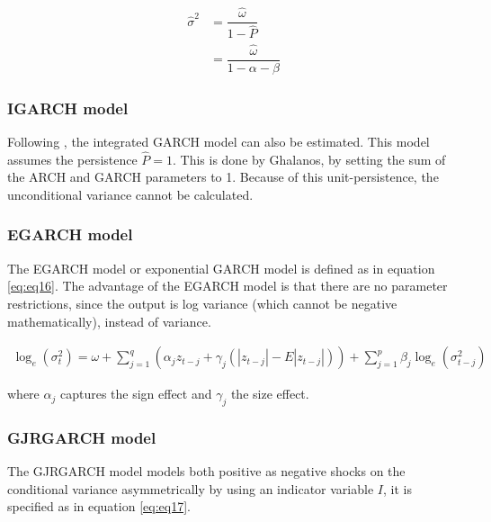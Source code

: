\documentclass[a4paper, twoside]{templates/ociamthesis}
\begin{document}
\begin{equation}
\begin{split}
\hat{\sigma}^2 
&= \dfrac{\hat{\omega}}{1 - \hat{P}} \\
&= \dfrac{\hat{\omega}}{1 - \alpha - \beta}
\end{split}
 \label{eq:eq15}
\end{equation}

\hypertarget{igarch-model}{%
\subsubsection{IGARCH model}\label{igarch-model}}

\noindent Following \textcite{ghalanos2020}, the integrated GARCH model \autocite{bollerslev1986} can also be estimated. This model assumes the persistence \(\hat{P} = 1\). This is done by Ghalanos, by setting the sum of the ARCH and GARCH parameters to 1. Because of this unit-persistence, the unconditional variance cannot be calculated.

\newpage

\hypertarget{egarch-model}{%
\subsubsection{EGARCH model}\label{egarch-model}}

\noindent The EGARCH model or exponential GARCH model \autocite{nelson1991} is defined as in equation \eqref{eq:eq16}. The advantage of the EGARCH model is that there are no parameter restrictions, since the output is log variance (which cannot be negative mathematically), instead of variance.

\begin{align}
\log_e(\sigma_t^2) = \omega + \sum\limits_{j=1}^q (\alpha_j z_{t-j} + \gamma_j (|z_{t-j}| - E|z_{t-j}|))+ \sum\limits_{j = 1}^p \beta_j \log_e(\sigma_{t-j}^2)
 \label{eq:eq16}
\end{align}

\noindent where \(\alpha_j\) captures the sign effect and \(\gamma_j\) the size effect.

\hypertarget{gjrgarch-model}{%
\subsubsection{GJRGARCH model}\label{gjrgarch-model}}

\noindent The GJRGARCH model \autocite{glosten1993} models both positive as negative shocks on the conditional variance asymmetrically by using an indicator variable \(I\), it is specified as in equation \eqref{eq:eq17}.
\end{document}
